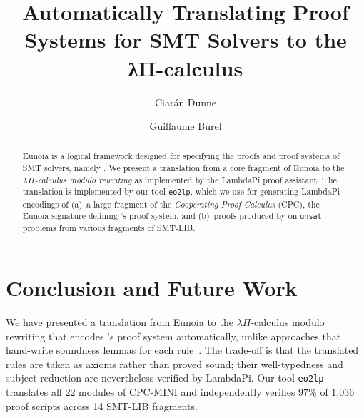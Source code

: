 \documentclass{llncs}
\title{%
	Automatically Translating Proof Systems
	for SMT Solvers to the λΠ-calculus}
\author{Ciarán Dunne\inst{1,3} \and Guillaume Burel\inst{2,3}}
\institute{\scriptsize INRIA, ENS Paris-Saclay;
  \and ensIIE;
  \and SAMOVAR, Télécom SudParis, Institut Polytechnique de Paris, 91120 Palaiseau, France}
\begin{document}
\maketitle


\begin{abstract}
	\noindent
	Eunoia is a logical framework designed for
	specifying the proofs and proof systems of SMT solvers,
	namely .
	We present a translation from a core fragment of Eunoia
	to the \emph{$λΠ$-calculus modulo rewriting} as implemented
	by the LambdaPi proof assistant.
	The translation is implemented by our tool \texttt{eo2lp},
	which we use for generating LambdaPi encodings of
	(a)~a large fragment of the
	\textit{Cooperating Proof Calculus} (CPC),
	the Eunoia signature defining 's proof system, and
	(b)~proofs produced by  on \texttt{unsat}
	problems from various fragments of SMT-LIB.
\end{abstract}









\section{Conclusion and Future Work}\label{sec:conclu}

We have presented a translation from Eunoia to the
$\lambda\Pi$-calculus modulo rewriting that encodes
's proof system automatically, unlike
approaches that hand-write soundness lemmas for each
rule~\cite{coltellacciReconstructionSMTProofs2024a,mohamed25leansmt}.
The trade-off is that the translated rules are taken
as axioms rather than proved sound; their
well-typedness and subject reduction are
nevertheless verified by LambdaPi. Our tool
\texttt{eo2lp} translates all 22 modules of CPC-MINI
and independently verifies 97\% of 1{,}036 proof
scripts across 14 SMT-LIB fragments.
\end{document}
